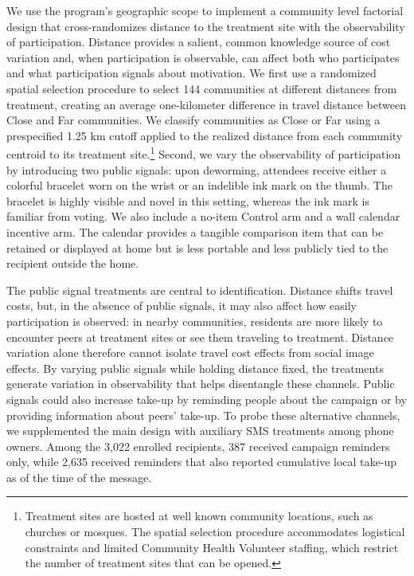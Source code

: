\documentclass[12pt,a4paper]{article}
\begin{document}
We use the program's geographic scope to implement a community level factorial design that cross-randomizes distance to the treatment site with the observability of participation. Distance provides a salient, common knowledge source of cost variation and, when participation is observable, can affect both who participates and what participation signals about motivation. We first use a randomized spatial selection procedure to select 144 communities at different distances from treatment, creating an average one-kilometer difference in travel distance between Close and Far communities. We classify communities as Close or Far using a prespecified 1.25 km cutoff applied to the realized distance from each community centroid to its treatment site.\footnote{Treatment sites are hosted at well known community locations, such as churches or mosques. The spatial selection procedure accommodates logistical constraints and limited Community Health Volunteer staffing, which restrict the number of treatment sites that can be opened.} Second, we vary the observability of participation by introducing two public signals: upon deworming, attendees receive either a colorful bracelet worn on the wrist or an indelible ink mark on the thumb. The bracelet is highly visible and novel in this setting, whereas the ink mark is familiar from voting. We also include a no-item Control arm and a wall calendar incentive arm. The calendar provides a tangible comparison item that can be retained or displayed at home but is less portable and less publicly tied to the recipient outside the home.

The public signal treatments are central to identification. Distance shifts travel costs, but, in the absence of public signals, it may also affect how easily participation is observed: in nearby communities, residents are more likely to encounter peers at treatment sites or see them traveling to treatment. Distance variation alone therefore cannot isolate travel cost effects from social image effects. By varying public signals while holding distance fixed, the treatments generate variation in observability that helps disentangle these channels. Public signals could also increase take-up by reminding people about the campaign or by providing information about peers' take-up. To probe these alternative channels, we supplemented the main design with auxiliary SMS treatments among phone owners. Among the 3{,}022 enrolled recipients, 387 received campaign reminders only, while 2{,}635 received reminders that also reported cumulative local take-up as of the time of the message.
\end{document}
